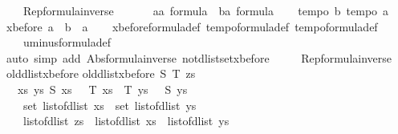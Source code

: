\begin{isabellebody}
\ \ \ \ Rep{\isacharunderscore}formula{\isacharunderscore}inverse{\isacharparenright}\isanewline
\ \ \isamarkupfalse%
\isanewline
\ \ \isamarkupfalse%
\ a{\isacharcolon}{\isacharcolon}{\isachardoublequoteopen}{\isacharprime}a\ formula{\isachardoublequoteclose}\ \ b{\isacharcolon}{\isacharcolon}{\isachardoublequoteopen}{\isacharprime}a\ formula{\isachardoublequoteclose}\isanewline
\ \ \isamarkupfalse%
\ {\isachardoublequoteopen}tempo{}\ b{\isachardoublequoteclose}\ {\isachardoublequoteopen}tempo{}\ a{\isachardoublequoteclose}\isanewline
\ \ \isamarkupfalse%
\ {\isachardoublequoteopen}xbefore\ a\ {\isacharparenleft}{\isacharminus}\ b{\isacharparenright}\ {\isacharequal}\ a{\isachardoublequoteclose}\isanewline
\ \ \isamarkupfalse%
\ xbefore{\isacharunderscore}formula{\isacharunderscore}def\ tempo{}{\isacharunderscore}formula{\isacharunderscore}def\ tempo{}{\isacharunderscore}formula{\isacharunderscore}def\isanewline
\ \ \ \ uminus{\isacharunderscore}formula{\isacharunderscore}def\ \isanewline
\ \ \isamarkupfalse%
\ {\isacharparenleft}auto\ simp\ add{\isacharcolon}\ Abs{\isacharunderscore}formula{\isacharunderscore}inverse\ not{\isacharunderscore}{}{\isacharunderscore}dlistset{\isacharunderscore}xbefore\ \isanewline
\ \ \ \ Rep{\isacharunderscore}formula{\isacharunderscore}inverse{\isacharparenright}\isanewline
{}\isamarkupfalse%
%
\endisatagproof
{\isafoldproof}%
%
\isadelimproof
%
\endisadelimproof
\isanewline
{}\isamarkupfalse%
%
\isamarkuptrue%
\isamarkupfalse%
\ old{\isacharunderscore}dlist{\isacharunderscore}xbefore\isanewline
{}\isanewline
{\isachardoublequoteopen}old{\isacharunderscore}dlist{\isacharunderscore}xbefore\ S\ T\ zs\ {\isasymequiv}\ \isanewline
\ \ {\isacharparenleft}{\isasymexists}\ xs\ ys{\isachardot}\ S\ xs\ {\isasymand}\ {\isasymnot}\ T\ xs\ {\isasymand}\ T\ ys\ {\isasymand}\ {\isasymnot}\ S\ ys\ {\isasymand}\ \isanewline
\ \ \ \ set\ {\isacharparenleft}list{\isacharunderscore}of{\isacharunderscore}dlist\ xs{\isacharparenright}\ {\isasyminter}\ set\ {\isacharparenleft}list{\isacharunderscore}of{\isacharunderscore}dlist\ ys{\isacharparenright}\ {\isacharequal}\ {\isacharbraceleft}{\isacharbraceright}\ {\isasymand}\ \isanewline
\ \ \ \ list{\isacharunderscore}of{\isacharunderscore}dlist\ zs\ {\isacharequal}\ {\isacharparenleft}list{\isacharunderscore}of{\isacharunderscore}dlist\ xs{\isacharparenright}\ {\isacharat}\ {\isacharparenleft}list{\isacharunderscore}of{\isacharunderscore}dlist\ ys{\isacharparenright}{\isacharparenright}{\isachardoublequoteclose}\isanewline

\end{isabellebody}
